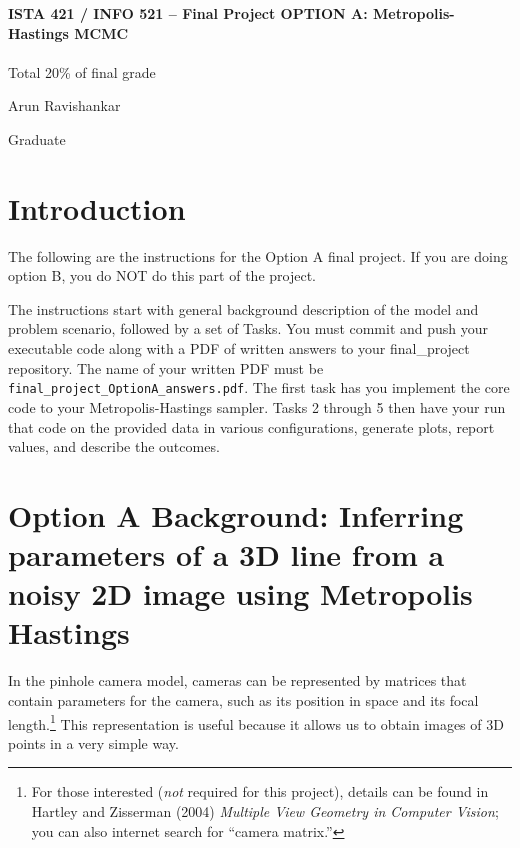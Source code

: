 \documentclass[10pt]{article}
\begin{document}
\begin{center}
    {\Large {\bf ISTA 421 / INFO 521 -- Final Project OPTION A: Metropolis-Hastings MCMC}} \\
     \\
    Total 20\% of final grade \\
    \vspace{1cm}
\end{center}

\begin{flushright}
Arun Ravishankar %

Graduate %
\end{flushright}

\section*{Introduction}

The following are the instructions for the Option A final project. If you are doing option B, you do NOT do this part of the project. 

The instructions start with general background description of the model and problem scenario, followed by a set of Tasks. You must commit and push your executable code along with a PDF of written answers to your final\_project repository. The name of your written PDF must be {\tt final\_project\_OptionA\_answers.pdf}. The first task has you implement the core code to your Metropolis-Hastings sampler. Tasks 2 through 5 then have your run that code on the provided data in various configurations, generate plots, report values, and describe the outcomes.

\section*{Option A Background: Inferring parameters of a 3D line from a noisy 2D image using Metropolis Hastings}

In the pinhole camera model, cameras can be represented by matrices that contain parameters for the camera, such as its position in space and its focal length.\footnote{For those interested ({\em not} required for this project), details can be found in Hartley and Zisserman (2004) {\em Multiple View Geometry in Computer Vision}; you can also internet search for ``camera matrix.''}  This representation is useful because it allows us to obtain images of 3D points in a very simple way.
\end{document}
